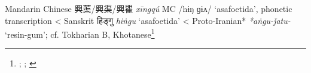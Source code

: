 \begin{etymology}\label{ety:xingqu}
Mandarin Chinese {興蕖/興渠/興瞿} \textit{xīngqú} \gls{MC} /hɨŋ ɡɨʌ/ `asafoetida', phonetic transcription
< Sanskrit {हिङ्गु} \textit{hiṅgu} `asafoetida'
< Proto-Iranian* \textit{*aṅgu-ǰatu-} `resin-gum'; cf. Tokharian B, Khotanese\footnote{\textcite{leung_itinerary_2019}; \textcite[353]{laufer_sino-iranica_1919}; \textcite[7]{adams_dictionary_2013}}
\end{etymology}